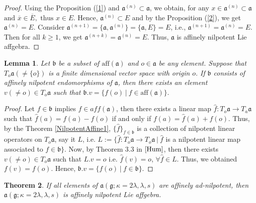 \documentclass{article}
\newtheorem{theorem}{Theorem}[section]
\newtheorem{lemma}[theorem]{Lemma}
\theoremstyle{definition}
\theoremstyle{remark}
\theoremstyle{plain}
\begin{document}
\begin{proof}
     Using the Proposition (\ref{1}) and $\mathfrak{a}^{(n)}\subset \mathfrak{a}$, we obtain, for any $x\in\mathfrak{a}^{(n)}\subset \mathfrak{a}$ $\text{and}$ $\overline{x}\in \overline{E},$ $\text{thus}$ $ x\in E.$ Hence, $\mathfrak{a}^{(n)}\subset E$ and by the Proposition (\ref{2}), we get $\mathfrak{a}^{(n)}=E.$ Consider $\mathfrak{a}^{(n+1)}=\{\mathfrak{a}, \mathfrak{a}^{(n)}\}=\{\mathfrak{a}, E\}=E$, i.e., $\mathfrak{a}^{(n+1)}=\mathfrak{a}^{(n)}=E.$ Then for all $k\geq 1$, we get $\mathfrak{a}^{(n+k)}=\mathfrak{a}^{(n)}=E.$ Thus, $\mathfrak{a}$ is affinely nilpotent Lie affgebra.
\end{proof}
\begin{lemma}\label{lemma 9.3}
    Let $\mathfrak{b}$ be a subset of $\text{aff}(\mathfrak{a})$ and $o\in \mathfrak{a}$ be any element. Suppose that $T_{o}\mathfrak{a}(\neq \lbrace o \rbrace)$ is a finite dimensional vector space with origin $o$. If $\mathfrak{b}$ consists of affinely nilpotent endomorphisms of $\mathfrak{a}$, then there exists an element $v(\neq o)\in T_{o}\mathfrak{a}$ such that $\mathfrak{b}.v=\{f(o)~|~f\in \text{aff}(\mathfrak{a})\}.$
\end{lemma}
\begin{proof}
    Let $f\in \mathfrak{b}$ implies $f\in aff(\mathfrak{a})$, then there exists a linear map $\hat{f}:T_{o}\mathfrak{a}\rightarrow T_{a}\mathfrak{a}$ such that $\hat{f}(a)=f(a)-f(o)$ if and only if $f(a)=\hat{f}(a)+f(o)$. Thus, by the Theorem \eqref{NilpotentAffine1}, $\{\hat{f}\}_{f\in \mathfrak{b}}$ is a collection of nilpotent linear operators on $T_{o}\mathfrak{a}$, say it $L$, i.e. $L:=\{\hat{f}:T_o\mathfrak{a}\rightarrow T_{o}\mathfrak{a} ~|~ \hat{f}$ is a nilpotent linear map associated to $f\in \mathfrak{b}\}.$ Now, by Theorem $3.3$ in $\cite{Hum}$, then there exists $v(\neq o)\in T_{o}\mathfrak{a}$ such that $L.v=o$ i.e. $\hat{f}(v)=o$, $\forall \hat{f}\in L$. Thus, we obtained  $f(v)=f(o)$. Hence, $\mathfrak{b}.v=\{ f(o)~|~ f\in \mathfrak{b}\}.$
\end{proof}
\begin{theorem}
    If all elements of $\mathfrak{a}(\mathfrak{g}; \kappa=2\lambda, \lambda, s)$ are affinely ad-nilpotent, then $\mathfrak{a}(\mathfrak{g}; \kappa=2\lambda, \lambda, s)$ is affinely nilpotent Lie affgebra.
\end{theorem}
\end{document}
